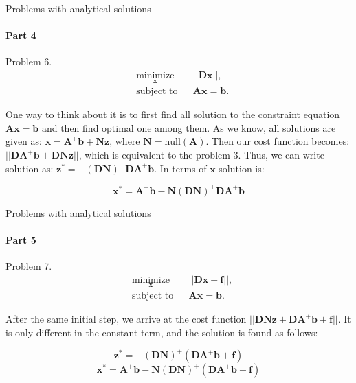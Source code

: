 \documentclass{beamer}
\begin{document}
\begin{frame}{Problems with analytical solutions}
\framesubtitle{Part 4}
\begin{flushleft}

Problem 6. 
%
\begin{equation}
\begin{aligned}
& \underset{\mathbf{x}}{\text{minimize}}
& & || \mathbf{D}\mathbf{x} ||, \\
& \text{subject to}
& & \mathbf{A} \mathbf{x} = \mathbf{b}.
\end{aligned}
\end{equation}

One way to think about it is to first find all solution to the constraint equation $\mathbf{A} \mathbf{x} = \mathbf{b}$ and then find optimal one among them. As we know, all solutions are given as: $\mathbf{x} = \mathbf{A}^+\mathbf{b} + \mathbf{N}\mathbf{z}$, where $\mathbf{N} = \text{null}(\mathbf{A})$. Then our cost function becomes: $|| \mathbf{D}\mathbf{A}^+\mathbf{b} +  \mathbf{D}\mathbf{N}\mathbf{z} ||$, which is equivalent to the problem 3. Thus, we can write solution as: $\mathbf{z}^* = -(\mathbf{D}\mathbf{N})^+ \mathbf{D}\mathbf{A}^+\mathbf{b}$. In terms of $\mathbf{x}$ solution is:

\begin{equation}
    \mathbf{x}^* = \mathbf{A}^+\mathbf{b}-\mathbf{N}(\mathbf{D}\mathbf{N})^+ \mathbf{D}\mathbf{A}^+\mathbf{b}
\end{equation}

\end{flushleft}
\end{frame}



\begin{frame}{Problems with analytical solutions}
\framesubtitle{Part 5}
\begin{flushleft}

Problem 7. 
%
\begin{equation}
\begin{aligned}
& \underset{\mathbf{x}}{\text{minimize}}
& & || \mathbf{D}\mathbf{x} + \mathbf{f} ||, \\
& \text{subject to}
& & \mathbf{A} \mathbf{x} = \mathbf{b}.
\end{aligned}
\end{equation}

After the same initial step, we arrive at the cost function $|| \mathbf{D}\mathbf{N}\mathbf{z} + \mathbf{D}\mathbf{A}^+\mathbf{b} + \mathbf{f}||$. It is only different in the constant term, and the solution is found as follows:


\begin{equation}
    \mathbf{z}^* = -(\mathbf{D}\mathbf{N})^+ (\mathbf{D}\mathbf{A}^+\mathbf{b} + \mathbf{f})
\end{equation}
\begin{equation}
    \mathbf{x}^* = \mathbf{A}^+\mathbf{b}-\mathbf{N}(\mathbf{D}\mathbf{N})^+ (\mathbf{D}\mathbf{A}^+\mathbf{b} + \mathbf{f})
\end{equation}


\end{flushleft}
\end{frame}
\end{document}
